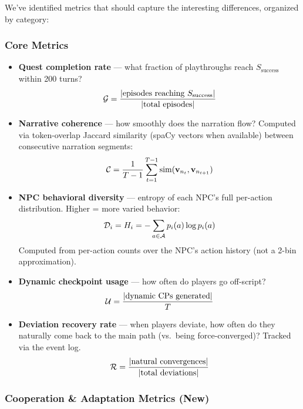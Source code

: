 We've identified metrics that should capture the interesting differences, organized by category:

\subsubsection{Core Metrics}

\begin{itemize}
    \item \textbf{Quest completion rate} --- what fraction of playthroughs reach $S_{\text{success}}$ within 200 turns?
    $$\mathcal{G} = \frac{|\text{episodes reaching } S_{\text{success}}|}{|\text{total episodes}|}$$

    \item \textbf{Narrative coherence} --- how smoothly does the narration flow? Computed via token-overlap Jaccard similarity (spaCy vectors when available) between consecutive narration segments:
    $$\mathcal{C} = \frac{1}{T-1} \sum_{t=1}^{T-1} \text{sim}(\mathbf{v}_{n_t}, \mathbf{v}_{n_{t+1}})$$

    \item \textbf{NPC behavioral diversity} --- entropy of each NPC's full per-action distribution. Higher = more varied behavior:
    $$\mathcal{D}_i = H_i = -\sum_{a \in \mathcal{A}} p_i(a) \log p_i(a)$$
    Computed from per-action counts over the NPC's action history (not a 2-bin approximation).

    \item \textbf{Dynamic checkpoint usage} --- how often do players go off-script?
    $$\mathcal{U} = \frac{|\text{dynamic CPs generated}|}{T}$$

    \item \textbf{Deviation recovery rate} --- when players deviate, how often do they naturally come back to the main path (vs.\ being force-converged)? Tracked via the event log.
    $$\mathcal{R} = \frac{|\text{natural convergences}|}{|\text{total deviations}|}$$
\end{itemize}

\subsubsection{Cooperation \& Adaptation Metrics (New)}

